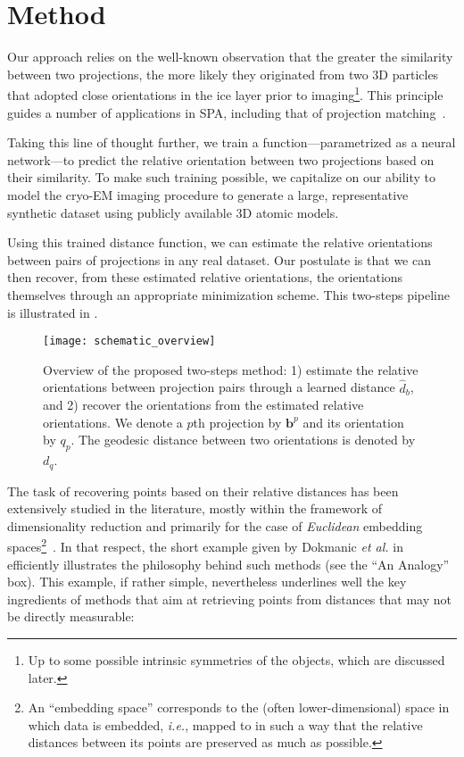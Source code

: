 \section{Method}

Our approach relies on the well-known observation that the greater the similarity between two projections, the more likely they originated from two 3D particles that adopted close orientations in the ice layer prior to imaging\footnote{Up to some possible intrinsic symmetries of the objects, which are discussed later.}. This principle guides a number of applications in SPA, including that of projection matching~\cite{penczek1994ribosome}.

Taking this line of thought further, we train a function---parametrized as a neural network---to predict the relative orientation between two projections based on their similarity. To make such training possible, we capitalize on our ability to model the cryo-EM imaging procedure to generate a large, representative synthetic dataset using publicly available 3D atomic models.

Using this trained distance function, we can estimate the relative orientations between pairs of projections in any real dataset. Our postulate is that we can then recover, from these estimated relative orientations, the orientations themselves through an appropriate minimization scheme. This two-steps pipeline is illustrated in .

\begin{figure}
    \centering
    \texttt{[image: schematic\_overview]}
    \caption{Overview of the proposed two-steps method: 1) estimate the relative orientations between projection pairs through a learned distance $\widehat{d}_b$, and 2) recover the orientations from the estimated relative orientations. We denote a $p$th projection by $\mathbf{b}^p$ and its orientation by $q_p$. The geodesic distance between two orientations is denoted by $d_q$.}
    \label{fig:schematic-overview}
\end{figure}

The task of recovering points based on their relative distances has been extensively studied in the literature, mostly within the framework of dimensionality reduction and primarily for the case of \textit{Euclidean} embedding spaces\footnote{An ``embedding space'' corresponds to the (often lower-dimensional) space in which data is embedded, \textit{i.e.}, mapped to in such a way that the relative distances between its points are preserved as much as possible.}~\cite{belkin2003laplacian,kruskal1978multidimensional, maaten2008visualizing, mcinnes2018umap,dokmanic2015euclidean}.
In that respect, the short example given by Dokmanic \textit{et al.} in~\cite{dokmanic2015euclidean} efficiently illustrates the philosophy behind such methods (see the ``An Analogy'' box).
This example, if rather simple, nevertheless underlines well the key ingredients of methods that aim at retrieving points from distances that may not be directly measurable:

